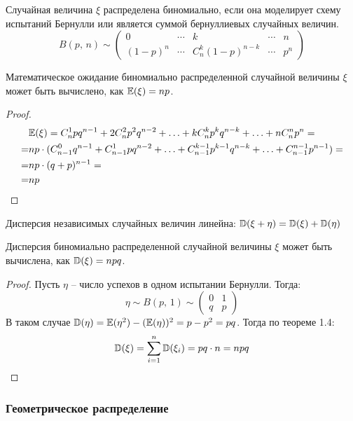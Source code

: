 \documentclass[12pt]{article}
\begin{document}
\begin{definition}
    Случайная величина $\xi$ распределена биномиально, если она моделирует схему испытаний  Бернулли или является суммой бернуллиевых случайных величин.
    $$B(p,\,n)\sim \begin{pmatrix}
        0 & \cdots & k & \cdots & n\\
        (1-p)^n & \cdots & C_n^k(1-p)^{n-k} & \cdots & p^n
    \end{pmatrix}$$
\end{definition}

\begin{theorem}
    Математическое ожидание биномиально распределенной случайной величины $\xi$ может быть вычислено, как $\mathbb{E}(\xi)=np$.
\end{theorem}

\begin{proof}
    \begin{align*}
        &\mathbb{E}(\xi) = C_n^1pq^{n-1} + 2C_n^2p^2q^{n-2} + \ldots + kC_n^kp^kq^{n-k} + \ldots + nC_n^np^n = \\
        =& np \cdot (C_{n-1}^0q^{n-1} + C_{n-1}^1pq^{n-2}+\ldots + C_{n-1}^{k-1}p^{k-1}q^{n-k} + \ldots + C_{n-1}^{n-1}p^{n-1})=\\
        =& np \cdot (q+p)^{n-1}=\\
        =& np
    \end{align*}
\end{proof}

\begin{theorem}
    Дисперсия независимых случайных величин линейна: $\mathbb{D}(\xi+\eta)=\mathbb{D}(\xi)+\mathbb{D}(\eta)$
\end{theorem}

\begin{lemma}
    Дисперсия биномиально распределенной случайной величины $\xi$ может быть вычислена, как $\mathbb{D}(\xi)=npq$.
\end{lemma}

\begin{proof}
    Пусть $\eta$ -- число успехов в одном испытании Бернулли. Тогда:
    $$\eta \sim B(p,\,1) \sim \begin{pmatrix}
        0 & 1\\
        q & p
    \end{pmatrix}$$
    В таком случае $\mathbb{D}(\eta)=\mathbb{E}(\eta^2)-(\mathbb{E}(\eta))^2=p-p^2=pq$. Тогда по теореме 1.4:
    $$\mathbb{D}(\xi)=\sum_{i=1}^{n}\mathbb{D}(\xi_i)=pq \cdot n = npq$$
\end{proof}

\subsubsection{Геометрическое распределение}
\end{document}
